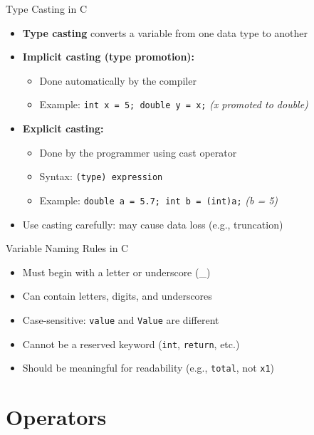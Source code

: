 \documentclass[12pt, aspectratio=169]{beamer}
\begin{document}
    \begin{frame}{Type Casting in C}
        \begin{itemize}
            \item \textbf{Type casting} converts a variable from one data type to another
            \item \textbf{Implicit casting (type promotion):}
                \begin{itemize}
                    \item Done automatically by the compiler
                    \item Example: \texttt{int x = 5; double y = x;} \hfill \emph{(x promoted to double)}
                \end{itemize}
            \item \textbf{Explicit casting:}
                \begin{itemize}
                    \item Done by the programmer using cast operator
                    \item Syntax: \texttt{(type) expression}
                    \item Example: \texttt{double a = 5.7; int b = (int)a;} \hfill \emph{(b = 5)}
                \end{itemize}
            \item Use casting carefully: may cause data loss (e.g., truncation)
        \end{itemize}
    \end{frame}


    \begin{frame}{Variable Naming Rules in C}
        \begin{itemize}
            \item Must begin with a letter or underscore (\_)
            \item Can contain letters, digits, and underscores
            \item Case-sensitive: \texttt{value} and \texttt{Value} are different
            \item Cannot be a reserved keyword (\texttt{int}, \texttt{return}, etc.)
            \item Should be meaningful for readability (e.g., \texttt{total}, not \texttt{x1})
        \end{itemize}
    \end{frame}


    \section{Operators}
\end{document}
